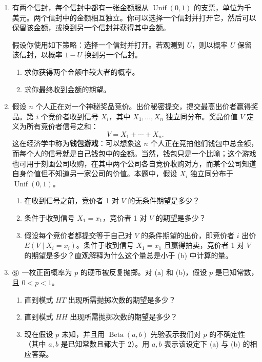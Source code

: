 \documentclass[UTF8, 12pt, fontset=fandol, oneside]{ctexart}
\begin{document}
\begin{enumerate}
  \item 有两个信封，每个信封中都有一张金额服从 $\operatorname{Unif}(0,1)$ 的支票，单位为千美元。两个信封中的金额相互独立。你可以选择一个信封并打开它，然后可以保留该金额，或换到另一个信封并获得其中金额。

  假设你使用如下策略：选择一个信封并打开。若观测到 $U$，则以概率 $U$ 保留该信封，以概率 $1-U$ 换到另一个信封。
  \begin{enumerate}
    \item[(a)] 求你获得两个金额中较大者的概率。
    \item[(b)] 求你最终收到金额的期望。
  \end{enumerate}

  \item 假设 $n$ 个人正在对一个神秘奖品竞价。出价秘密提交，提交最高出价者赢得奖品。第 $i$ 个竞价者收到信号 $X_i$，其中 $X_1,\ldots,X_n$ 独立同分布。奖品价值 $V$ 定义为所有竞价者信号之和：
  \[
    V=X_1+\cdots+X_n.
  \]
  这在经济学中称为\textbf{钱包游戏}：可以想象这 $n$ 个人正在竞拍他们钱包中总金额，而每个人的信号就是自己钱包中的金额。当然，钱包只是一个比喻；这个游戏也可用于刻画公司收购，在其中两个公司各自竞价收购对方，而某个公司知道自身价值但不知道另一家公司的价值。本题中，假设 $X_i$ 独立同分布于 $\operatorname{Unif}(0,1)$。
  \begin{enumerate}
    \item[(a)] 在收到信号之前，竞价者 1 对 $V$ 的无条件期望是多少？
    \item[(b)] 条件于收到信号 $X_1=x_1$，竞价者 1 对 $V$ 的期望是多少？
    \item[(c)] 假设每个竞价者都提交等于自己对 $V$ 的条件期望的出价，即竞价者 $i$ 出价 $E(V\mid X_i=x_i)$。条件于收到信号 $X_1=x_1$ 且赢得拍卖，竞价者 1 对 $V$ 的期望是多少？直观解释为什么这个量总是小于 (b) 中计算的量。
  \end{enumerate}

  \item $\circledS$ 一枚正面概率为 $p$ 的硬币被反复抛掷。对 (a) 和 (b)，假设 $p$ 是已知常数，且 $0<p<1$。
  \begin{enumerate}
    \item[(a)] 直到模式 $HT$ 出现所需抛掷次数的期望是多少？
    \item[(b)] 直到模式 $HH$ 出现所需抛掷次数的期望是多少？
    \item[(c)] 现在假设 $p$ 未知，并且用 $\operatorname{Beta}(a,b)$ 先验表示我们对 $p$ 的不确定性（其中 $a,b$ 是已知常数且都大于 $2$）。用 $a,b$ 表示该设定下 (a) 与 (b) 的相应答案。
  \end{enumerate}


\end{enumerate}
\end{document}
